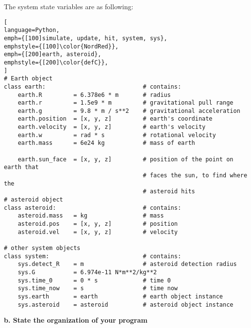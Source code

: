 \documentclass[article, 12pt, a4paper]{memoir}
\begin{document}
\begin{solution}
    [a]
    The system state variables are as following:
\begin{lstlisting}[
language=Python,
emph={[100]simulate, update, hit, system, sys},
emphstyle={[100]\color{NordRed}},
emph={[200]earth, asteroid},
emphstyle={[200]\color{defC}},
]
# Earth object
class earth:                            # contains:
    earth.R         = 6.378e6 * m       # radius
    earth.r         = 1.5e9 * m         # gravitational pull range
    earth.g         = 9.8 * m / s**2    # gravitational acceleration
    earth.position  = [x, y, z]         # earth's coordinate
    earth.velocity  = [x, y, z]         # earth's velocity
    earth.w         = rad * s           # rotational velocity
    earth.mass      = 6e24 kg           # mass of earth

    earth.sun_face  = [x, y, z]         # position of the point on earth that 
                                        # faces the sun, to find where the
                                        # asteroid hits
# asteroid object
class asteroid:                         # contains:
    asteroid.mass   = kg                # mass
    asteroid.pos    = [x, y, z]         # position
    asteroid.vel    = [x, y, z]         # velocity

# other system objects
class system:                           # contains:
    sys.detect_R    = m                 # asteroid detection radius
    sys.G           = 6.974e-11 N*m**2/kg**2
    sys.time_0      = 0 * s             # time 0
    sys.time_now    = s                 # time now             
    sys.earth       = earth             # earth object instance
    sys.asteroid    = asteroid          # asteroid object instance
\end{lstlisting}
\end{solution}

\textbf{b. State the organization of your program}
\vspace{1em}
\end{document}
